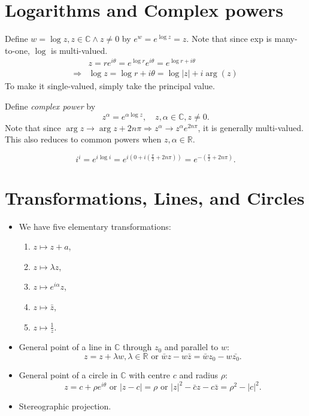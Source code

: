 \documentclass[10pt]{article}
\begin{document}
    \section{Logarithms and Complex powers}
    \begin{definition}
        Define $ w = \log z, z\in \mathbb{C} \land z\neq 0 $ by $ e^w = e^{\log z}=z $. Note that since exp is many-to-one, $\log$ is multi-valued.
        \[
            \begin{aligned}
                 & z = re^{i\theta} =e^{\log r}e^{i\theta}=e^{\log r+ i\theta}\\
                 \Longrightarrow & \boxed{\log z = \log r+i\theta = \log |z|+i\arg(z)}
            \end{aligned}
        \]
        To make it single-valued, simply take the principal value.
    \end{definition}
    \begin{definition}
        Define \textit{complex power} by 
        \[
            z^\alpha = e^{\alpha\log z}, \quad z,\alpha\in \mathbb{C} , z\neq 0
        .\]
        Note that since $ \arg z \to \arg z + 2n\pi \Rightarrow z^\alpha \to z^\alpha e^{2n\pi} $, it is generally multi-valued. This also reduces to common powers when $ z,\alpha\in \mathbb{R}. $
    \end{definition}
    \begin{example}
        \[
            i^i = e^{i\log i} = e^{i(0+i(\frac{\pi}{2}+2n\pi))} = e^{-(\frac{\pi}{2}+2n\pi)}
        .\]
    \end{example}
    \section{Transformations, Lines, and Circles}
    \begin{itemize}
        \item We have five elementary transformations:
        \begin{enumerate}[(1)]
            \item $ z \mapsto z+a $,
            \item $ z \mapsto \lambda z $,
            \item $ z \mapsto e^{i\alpha} z $,
            \item $ z \mapsto \bar{z} $,
            \item $ z \mapsto \frac{1}{z} $.
        \end{enumerate}
        \item General point of a line in $\mathbb{C}$ through $z_0$ and parallel to $w$:
        \[
            z = z +\lambda w, \lambda\in \mathbb{R} \text{ or } \bar{w}z-w\bar{z}=\bar{w}z_0-w\bar{z_0}
        .\]
        \item General point of a circle in $\mathbb{C}$ with centre $ c $ and radius $ \rho $:
        \[
            z = c+ \rho e^{i\theta} \text{ or } \left| z-c \right| = \rho \text{ or } |z|^2-\bar{c}z-c\bar{z}=\rho^2-|c|^2
        .\]
        \item Stereographic projection.
    \end{itemize}
\end{document}
